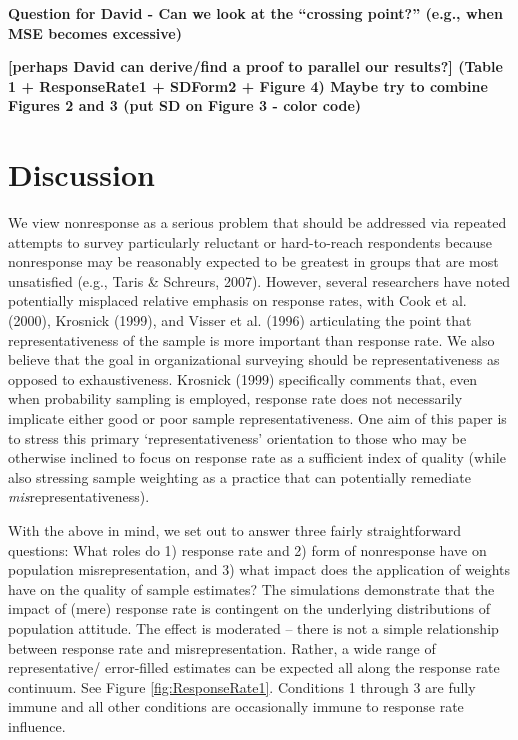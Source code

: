 \documentclass[
  man,mask]{apa7}
\begin{document}
\textbf{Question for David - Can we look at the ``crossing point?'' (e.g., when MSE becomes excessive)}

\textbf{{[}perhaps David can derive/find a proof to parallel our results?{]} (Table 1 + ResponseRate1 + SDForm2 + Figure 4) Maybe try to combine Figures 2 and 3 (put SD on Figure 3 - color code)}

\section{Discussion}\label{discussion}

We view nonresponse as a serious problem that should be addressed via repeated attempts to survey particularly reluctant or hard-to-reach respondents because nonresponse may be reasonably expected to be greatest in groups that are most unsatisfied (e.g., Taris \& Schreurs, 2007). However, several researchers have noted potentially misplaced relative emphasis on response rates, with Cook et al. (2000), Krosnick (1999), and Visser et al. (1996) articulating the point that representativeness of the sample is more important than response rate. We also believe that the goal in organizational surveying should be representativeness as opposed to exhaustiveness. Krosnick (1999) specifically comments that, even when probability sampling is employed, response rate does not necessarily implicate either good or poor sample representativeness. One aim of this paper is to stress this primary `representativeness' orientation to those who may be otherwise inclined to focus on response rate as a sufficient index of quality (while also stressing sample weighting as a practice that can potentially remediate \emph{mis}representativeness).

With the above in mind, we set out to answer three fairly straightforward questions: What roles do 1) response rate and 2) form of nonresponse have on population misrepresentation, and 3) what impact does the application of weights have on the quality of sample estimates? The simulations demonstrate that the impact of (mere) response rate is contingent on the underlying distributions of population attitude. The effect is moderated -- there is not a simple relationship between response rate and misrepresentation. Rather, a wide range of representative/ error-filled estimates can be expected all along the response rate continuum. See Figure \ref{fig:ResponseRate1}. Conditions 1 through 3 are fully immune and all other conditions are occasionally immune to response rate influence.
\end{document}

